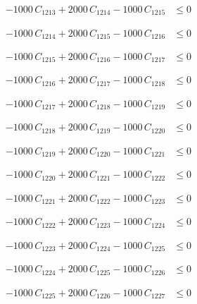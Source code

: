 \documentclass[a4paper,11pt]{article}
\begin{document}
\begin{align}
-1000\,C_{1213} + 2000\,C_{1214} - 1000\,C_{1215} &\leq 0 \nonumber
\end{align}

\begin{align}
-1000\,C_{1214} + 2000\,C_{1215} - 1000\,C_{1216} &\leq 0 \nonumber
\end{align}

\begin{align}
-1000\,C_{1215} + 2000\,C_{1216} - 1000\,C_{1217} &\leq 0 \nonumber
\end{align}

\begin{align}
-1000\,C_{1216} + 2000\,C_{1217} - 1000\,C_{1218} &\leq 0 \nonumber
\end{align}

\begin{align}
-1000\,C_{1217} + 2000\,C_{1218} - 1000\,C_{1219} &\leq 0 \nonumber
\end{align}

\begin{align}
-1000\,C_{1218} + 2000\,C_{1219} - 1000\,C_{1220} &\leq 0 \nonumber
\end{align}

\begin{align}
-1000\,C_{1219} + 2000\,C_{1220} - 1000\,C_{1221} &\leq 0 \nonumber
\end{align}

\begin{align}
-1000\,C_{1220} + 2000\,C_{1221} - 1000\,C_{1222} &\leq 0 \nonumber
\end{align}

\begin{align}
-1000\,C_{1221} + 2000\,C_{1222} - 1000\,C_{1223} &\leq 0 \nonumber
\end{align}

\begin{align}
-1000\,C_{1222} + 2000\,C_{1223} - 1000\,C_{1224} &\leq 0 \nonumber
\end{align}

\begin{align}
-1000\,C_{1223} + 2000\,C_{1224} - 1000\,C_{1225} &\leq 0 \nonumber
\end{align}

\begin{align}
-1000\,C_{1224} + 2000\,C_{1225} - 1000\,C_{1226} &\leq 0 \nonumber
\end{align}

\begin{align}
-1000\,C_{1225} + 2000\,C_{1226} - 1000\,C_{1227} &\leq 0 \nonumber
\end{align}
\end{document}

